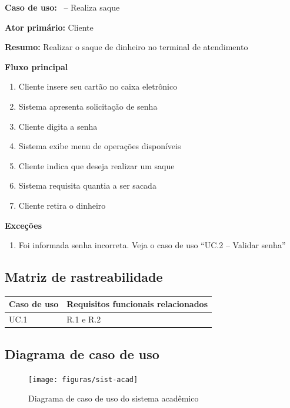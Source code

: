 \documentclass[11pt]{report}
\begin{document}
\noindent\textbf{Caso de uso:} \casodeuso~-- Realiza saque

\noindent\textbf{Ator primário:} Cliente

\noindent\textbf{Resumo: } Realizar o saque de dinheiro no terminal de atendimento

\noindent\textbf{Fluxo principal} 
\begin{enumerate}
	\item Cliente insere seu cartão no caixa eletrônico
	\item Sistema apresenta solicitação de senha
	\item Cliente digita a senha
	\item Sistema exibe menu de operações disponíveis
	\item Cliente indica que deseja realizar um saque
	\item Sistema requisita quantia a ser sacada
	\item Cliente retira o dinheiro
\end{enumerate}

\noindent\textbf{Exceções}
\begin{enumerate}
	\item Foi informada senha incorreta. Veja o caso de uso ``UC.2 -- Validar senha''
\end{enumerate}


\subsection{Matriz de rastreabilidade}

\noindent\begin{tabular}{|l|l|}\hline
\textbf{Caso de uso} & \textbf{Requisitos funcionais relacionados}\\\hline
UC.1 & R.1 e R.2\\\hline
\end{tabular}

\clearpage
\subsection{Diagrama de caso de uso}

\begin{figure}[!htbp]
	\centering
	\texttt{[image: figuras/sist-acad]}
	\caption{Diagrama de caso de uso do sistema acadêmico}
	\label{fig:usecase}
\end{figure}






\end{document}
